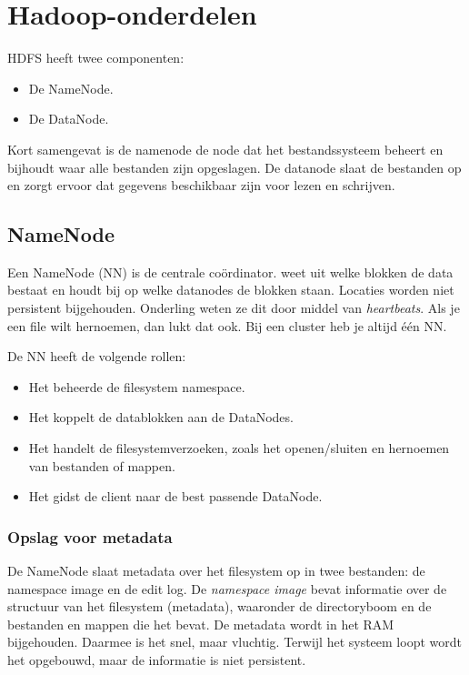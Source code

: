 \documentclass[a4paper,10pt,twoside]{report}
\begin{document}
\section{Hadoop-onderdelen}

HDFS heeft twee componenten:

\begin{itemize}
	\item De NameNode.
	\item De DataNode.
\end{itemize}

Kort samengevat is de namenode de node dat het bestandssysteem beheert en bijhoudt waar alle bestanden zijn opgeslagen. De datanode slaat de bestanden op en zorgt ervoor dat gegevens beschikbaar zijn voor lezen en schrijven.

\subsection{NameNode}

Een NameNode (NN) is de centrale coördinator. weet uit welke blokken de data bestaat en houdt bij op welke datanodes de blokken staan. Locaties worden niet persistent bijgehouden. Onderling weten ze dit door middel van \textit{heartbeats}.  Als je een file wilt hernoemen, dan lukt dat ook. Bij een cluster heb je altijd één NN.

De NN heeft de volgende rollen:

\begin{itemize}
	\item Het beheerde de filesystem namespace.
	\item Het koppelt de datablokken aan de DataNodes.
	\item Het handelt de filesystemverzoeken, zoals het openen/sluiten en hernoemen van bestanden of mappen.
	\item Het gidst de client naar de best passende DataNode.
\end{itemize}

\subsubsection{Opslag voor metadata}

De NameNode slaat metadata over het filesystem op in twee bestanden: de namespace image en de edit log. De \textit{namespace image} bevat informatie over de structuur van het filesystem (metadata), waaronder de directoryboom en de bestanden en mappen die het bevat. De metadata wordt in het RAM bijgehouden. Daarmee is het snel, maar vluchtig. Terwijl het systeem loopt wordt het opgebouwd, maar de informatie is niet persistent. 
\end{document}
